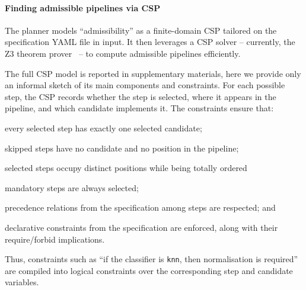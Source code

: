 \documentclass[runningheads]{llncs}
\newenvironment{inlinelist}{\begin{enumerate*}[label=\emph{(\roman*)}]}{\end{enumerate*}}
\begin{document}
\paragraph{Finding admissible pipelines via \acs{CSP}}

The planner models ``admissibility'' as a finite-domain \ac{CSP}
tailored on the specification YAML file in input.
%
It then leverages a \ac{CSP} solver
-- currently, the Z3 theorem prover~\cite{DBLP:conf/tacas/MouraB08} --
to compute admissible pipelines efficiently.

The full \ac{CSP} model is reported in supplementary materials,
here we provide only an informal sketch of its main components and constraints.
%
For each possible step,
the \ac{CSP} records whether the step is selected,
where it appears in the pipeline,
and which candidate implements it.
%
The constraints ensure that:
%
\begin{inlinelist}
  \item every selected step has exactly one selected candidate;
  \item skipped steps have no candidate and no position in the pipeline;
  \item selected steps occupy distinct positions while being totally ordered
  \item mandatory steps are always selected;
  \item precedence relations from the specification among steps are respected;
  and
  \item declarative constraints from the specification are enforced,
  along with their require/forbid implications.
\end{inlinelist}
%
Thus,
constraints such as
``if the classifier is \texttt{knn}, then normalisation is required''
are compiled into logical constraints over the corresponding step and candidate variables.

\end{document}
